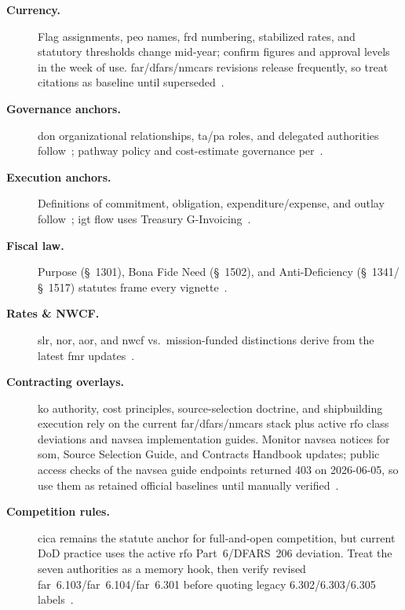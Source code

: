 \documentclass[../main.tex]{subfiles}
\begin{document}
\begin{description}
  \item[\textbf{Currency.}] Flag assignments, \ac{peo} names, \ac{frd} numbering, stabilized rates, and statutory thresholds change mid-year; confirm figures and approval levels in the week of use. \ac{far}/\ac{dfars}/\ac{nmcars} revisions release frequently, so treat citations as baseline until superseded~\autocite{FAR,DFARS,NMCARS}.
  \item[\textbf{Governance anchors.}] \ac{don} organizational relationships, \ac{ta}/\ac{pa} roles, and delegated authorities follow~\autocite{SECNAV5400-15D,SECNAV5000-2G}; pathway policy and cost-estimate governance per~\autocite{DoDI5000-85}.
  \item[\textbf{Execution anchors.}] Definitions of commitment, obligation, expenditure/expense, and outlay follow~\autocite{DoDFMR-Vol3-Ch8}; \ac{igt} flow uses Treasury G-Invoicing~\autocite{Treasury-GInvoicing}.
  \item[\textbf{Fiscal law.}] Purpose (\S~1301), Bona Fide Need (\S~1502), and Anti-Deficiency (\S~1341/\S~1517) statutes frame every vignette~\autocite{USC-1301-Purpose,USC-1502-BFN,USC-1341-ADA,USC-1517-ADA}.
  \item[\textbf{Rates \& NWCF.}] \ac{slr}, \ac{nor}, \ac{aor}, and \ac{nwcf} vs.\ mission-funded distinctions derive from the latest \ac{fmr} updates~\autocite{DoDFMR-Vol3-Ch19,DoDFMR-Vol11B-Ch3}.
  \item[\textbf{Contracting overlays.}] \ac{ko} authority, cost principles, source-selection doctrine, and shipbuilding execution rely on the current \ac{far}/\ac{dfars}/\ac{nmcars} stack plus active \ac{rfo} class deviations and \ac{navsea} implementation guides. Monitor \ac{navsea} notices for \ac{som}, Source Selection Guide, and Contracts Handbook updates; public access checks of the \ac{navsea} guide endpoints returned 403 on 2026-06-05, so use them as retained official baselines until manually verified~\autocite{FAR,DFARS,NMCARS,FAR-Overhaul-Deviation-Guide-2026,SOM-Ch3-2023,NAVSEA-Source-Selection-Guide-2022,NAVSEA-Contracts-Handbook-2023}.
  \item[\textbf{Competition rules.}] \ac{cica} remains the statute anchor for full-and-open competition, but current DoD practice uses the active \ac{rfo} Part~6/DFARS~206 deviation. Treat the seven authorities as a memory hook, then verify revised \ac{far}~6.103/\ac{far}~6.104/\ac{far}~6.301 before quoting legacy 6.302/6.303/6.305 labels~\autocite{USC-3201-CICA,FAR-Overhaul-Part6-2026,DoD-RFO-Deviation-Part6-2026}.

\end{description}
\end{document}
